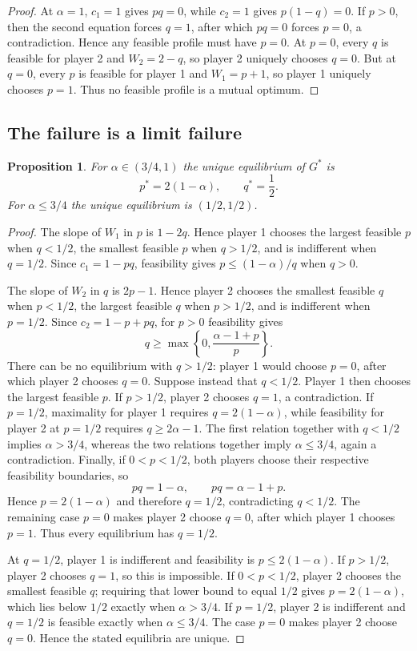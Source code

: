 \documentclass[11pt]{article}
\newtheorem{proposition}[theorem]{Proposition}
\theoremstyle{definition}
\begin{document}
\begin{proof}
At $\alpha=1$, $c_1=1$ gives $pq=0$, while $c_2=1$ gives $p(1-q)=0$. If $p>0$, then the second equation forces $q=1$, after which $pq=0$ forces $p=0$, a contradiction. Hence any feasible profile must have $p=0$. At $p=0$, every $q$ is feasible for player 2 and $W_2=2-q$, so player 2 uniquely chooses $q=0$. But at $q=0$, every $p$ is feasible for player 1 and $W_1=p+1$, so player 1 uniquely chooses $p=1$. Thus no feasible profile is a mutual optimum.
\end{proof}

\subsection{The failure is a limit failure}
\begin{proposition}\label{prop:path}
For $\alpha\in(3/4,1)$ the unique equilibrium of $G^*$ is
\[
p^*=2(1-\alpha),\qquad q^*=\frac12.
\]
For $\alpha\le3/4$ the unique equilibrium is $(1/2,1/2)$.
\end{proposition}

\begin{proof}
The slope of $W_1$ in $p$ is $1-2q$. Hence player 1 chooses the largest feasible $p$ when $q<1/2$, the smallest feasible $p$ when $q>1/2$, and is indifferent when $q=1/2$. Since $c_1=1-pq$, feasibility gives $p\le(1-\alpha)/q$ when $q>0$.

The slope of $W_2$ in $q$ is $2p-1$. Hence player 2 chooses the smallest feasible $q$ when $p<1/2$, the largest feasible $q$ when $p>1/2$, and is indifferent when $p=1/2$. Since $c_2=1-p+pq$, for $p>0$ feasibility gives
\[
q\ge \max\!\left\{0,\frac{\alpha-1+p}{p}\right\}.
\]
There can be no equilibrium with $q>1/2$: player 1 would choose $p=0$, after which player 2 chooses $q=0$. Suppose instead that $q<1/2$. Player 1 then chooses the largest feasible $p$. If $p>1/2$, player 2 chooses $q=1$, a contradiction. If $p=1/2$, maximality for player 1 requires $q=2(1-\alpha)$, while feasibility for player 2 at $p=1/2$ requires $q\ge2\alpha-1$. The first relation together with $q<1/2$ implies $\alpha>3/4$, whereas the two relations together imply $\alpha\le3/4$, again a contradiction. Finally, if $0<p<1/2$, both players choose their respective feasibility boundaries, so
\[
pq=1-\alpha,
\qquad
pq=\alpha-1+p.
\]
Hence $p=2(1-\alpha)$ and therefore $q=1/2$, contradicting $q<1/2$. The remaining case $p=0$ makes player 2 choose $q=0$, after which player 1 chooses $p=1$. Thus every equilibrium has $q=1/2$.

At $q=1/2$, player 1 is indifferent and feasibility is $p\le2(1-\alpha)$. If $p>1/2$, player 2 chooses $q=1$, so this is impossible. If $0<p<1/2$, player 2 chooses the smallest feasible $q$; requiring that lower bound to equal $1/2$ gives $p=2(1-\alpha)$, which lies below $1/2$ exactly when $\alpha>3/4$. If $p=1/2$, player 2 is indifferent and $q=1/2$ is feasible exactly when $\alpha\le3/4$. The case $p=0$ makes player 2 choose $q=0$. Hence the stated equilibria are unique.
\end{proof}
\end{document}
